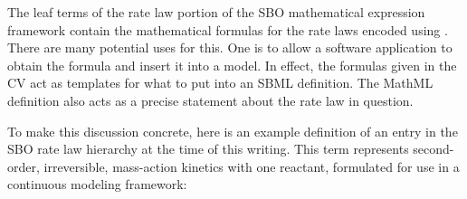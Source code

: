 The leaf terms of the rate law portion of the SBO mathematical
expression framework contain the mathematical formulas for the
rate laws encoded using \mathmltwo.  There are many potential uses
for this.  One is to allow a software application to obtain the
formula and insert it into a model.  In effect, the formulas given
in the CV act as templates for what to put into an SBML
\KineticLaw definition.  The MathML definition also acts as a
precise statement about the rate law in question.     

To make this discussion concrete, here is an example definition of
an entry in the SBO rate law hierarchy at the time of this
writing.  This term represents second-order, irreversible,
mass-action kinetics with one reactant, formulated for use in a
continuous modeling framework:
